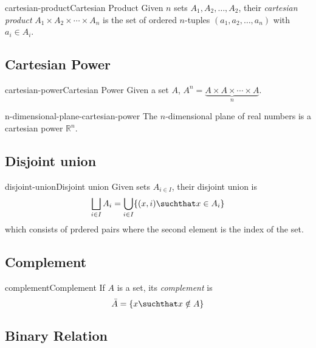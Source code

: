 \documentclass[preview]{standalone}
\begin{document}
\begin{snippetdefinition}{cartesian-product}{Cartesian Product}{
    Given \(n\) sets \(A_1, A_2, \ldots, A_2\),
    their \textit{cartesian product} \(A_1 \times A_2 \times \cdots \times A_n\)
    is the set of ordered \(n\)-tuples \((a_1, a_2, \ldots, a_n)\) with \(a_i\in A_i\).
}
\end{snippetdefinition}

\subsection{Cartesian Power}

\begin{snippetdefinition}{cartesian-power}{Cartesian Power}{
    Given a set \(A\), \(A^n=\underbrace{A\times A\times \cdots \times A}_n\).
}
\end{snippetdefinition}

\begin{snippet}{n-dimensional-plane-cartesian-power}
The \(n\)-dimensional plane of real numbers is a cartesian power \({\mathbb{R}}^n\).
\end{snippet}

\subsection{Disjoint union}

\begin{snippetdefinition}{disjoint-union}{Disjoint union}{
    Given sets \(A_{i\in I}\), their disjoint union is
    \[
        \bigsqcup_{i\in I}A_i= \bigcup_{i\in I}\{(x, i) \suchthat x \in A_i\}
    \]
    which consists of prdered pairs where the second element
    is the index of the set.
}
\end{snippetdefinition}

\subsection{Complement}

\begin{snippetdefinition}{complement}{Complement}{
    If \(A\) is a set, its \textit{complement} is
    \[
        \bar{A} = \{x \suchthat x \notin A\}
    \]
}
\end{snippetdefinition}

\subsection{Binary Relation}
\end{document}
